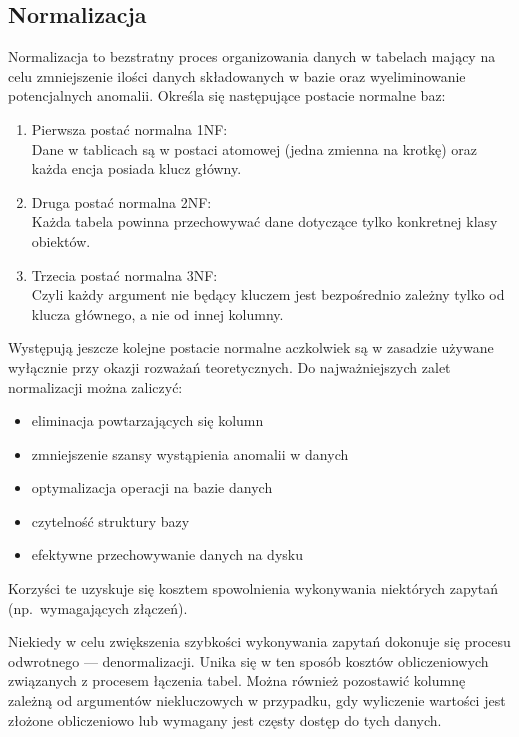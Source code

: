 \documentclass[polish, 11pt]{article}
\begin{document}
    \subsection{Normalizacja}
    Normalizacja to bezstratny proces organizowania danych w tabelach mający na celu zmniejszenie ilości danych składowanych
    w bazie oraz wyeliminowanie potencjalnych anomalii.
    Określa się następujące postacie normalne baz:
    \begin{enumerate}
        \item Pierwsza postać normalna 1NF:\\
            Dane w tablicach są w postaci atomowej (jedna zmienna na krotkę) oraz każda encja posiada klucz główny.
        \item Druga postać normalna 2NF:\\
            Każda tabela powinna przechowywać dane dotyczące tylko konkretnej klasy obiektów.
        \item Trzecia postać normalna 3NF:\\
            Czyli każdy argument nie będący kluczem jest bezpośrednio zależny tylko od klucza głównego, a nie od innej kolumny.
    \end{enumerate}
    
    Występują jeszcze kolejne postacie normalne aczkolwiek są w zasadzie używane wyłącznie przy okazji rozważań teoretycznych.
\newpage
    Do najważniejszych zalet normalizacji można zaliczyć:
    \begin{itemize}
        \item eliminacja powtarzających się kolumn
        \item zmniejszenie szansy wystąpienia anomalii w danych
        \item optymalizacja operacji na bazie danych
        \item czytelność struktury bazy
        \item efektywne przechowywanie danych na dysku
    \end{itemize}

    Korzyści te uzyskuje się kosztem spowolnienia wykonywania niektórych zapytań (np.\ wymagających złączeń).

    Niekiedy w celu zwiększenia szybkości wykonywania zapytań dokonuje się procesu odwrotnego --- denormalizacji.
    Unika się w ten sposób kosztów obliczeniowych związanych z procesem łączenia tabel.
    Można również pozostawić kolumnę zależną od argumentów niekluczowych w przypadku,
    gdy wyliczenie wartości jest złożone obliczeniowo lub wymagany jest częsty dostęp do tych danych.
\end{document}
